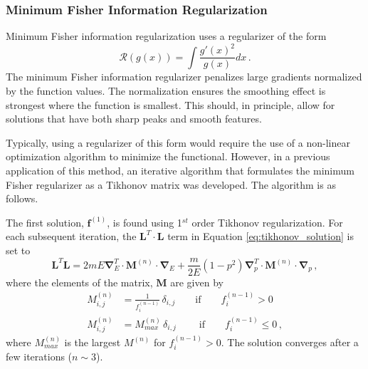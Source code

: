 \subsubsection{Minimum Fisher Information Regularization}
Minimum Fisher information regularization uses a regularizer of the form\cite{Anton1996}
\begin{equation}
    \mathcal{R}(g(x)) = \int \frac{g'(x)^2}{g(x)} dx\,.
\end{equation}
The minimum Fisher information regularizer penalizes large gradients normalized by the function values.
The normalization ensures the smoothing effect is strongest where the function is smallest. This should, in principle, allow for solutions that have both sharp peaks and smooth features.

Typically, using a regularizer of this form would require the use of a non-linear optimization algorithm to minimize the functional. However, in a previous application of this method\cite{Anton1996}, an iterative algorithm that formulates the minimum Fisher regularizer as a Tikhonov matrix was developed.  
The algorithm is as follows.

The first solution, $\mathbf{f}^{(1)}$, is found using 1$^{st}$ order Tikhonov regularization.
For each subsequent iteration, the $\mathbf{L}^T \cdot \mathbf{L}$ term in Equation \ref{eq:tikhonov_solution} is set to
\begin{equation}
    \mathbf{L}^T \mathbf{L} = 2mE \boldsymbol{\nabla}_E^T \cdot \mathbf{M}^{(n)} \cdot \boldsymbol{\nabla}_E + \frac{m}{2E} \left(1-p^2 \right) \boldsymbol{\nabla}_p^T \cdot \mathbf{M}^{(n)}\cdot\boldsymbol{\nabla}_p \, ,
\end{equation}
where the elements of the matrix, $\mathbf{M}$ are given by
\begin{equation}
\begin{split}
    M^{(n)}_{i,j} &= \frac{1}{f_i^{(n-1)}} \, \delta_{i,j} \qquad \mathrm{if} \qquad f^{(n-1)}_i > 0\\
    M^{(n)}_{i,j} &= M^{(n)}_{max} \, \delta_{i,j} \qquad\; \mathrm{if} \qquad f^{(n-1)}_i \leq 0 \, ,
\end{split}
\end{equation}
where $M^{(n)}_{max}$ is the largest $M^{(n)}$ for $f^{(n-1)}_i > 0$.
The solution converges after a few iterations ($n\sim3$).

